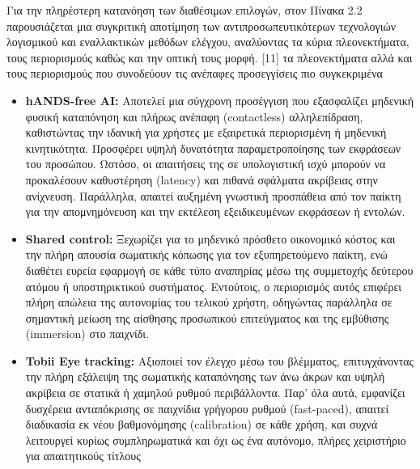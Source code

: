 \documentclass[twoside, a4paper, 11pt]{article}
\begin{document}
Για την πληρέστερη κατανόηση των διαθέσιμων επιλογών, στον Πίνακα 2.2 παρουσιάζεται μια συγκριτική αποτίμηση των αντιπροσωπευτικότερων τεχνολογιών λογισμικού και εναλλακτικών μεθόδων ελέγχου, αναλύοντας τα κύρια πλεονεκτήματα, τους περιορισμούς καθώς και την οπτική τους μορφή. [11]
τα πλεονεκτήματα αλλά και τους περιορισμούς που συνοδεύουν τις ανέπαφες προσεγγίσεις πιο συγκεκριμένα
\begin{itemize}
    \item \textbf{hANDS-free AI:} Αποτελεί μια σύγχρονη προσέγγιση που εξασφαλίζει μηδενική φυσική καταπόνηση και πλήρως ανέπαφη (contactless) αλληλεπίδραση, καθιστώντας την ιδανική για χρήστες με εξαιρετικά περιορισμένη ή μηδενική κινητικότητα. Προσφέρει υψηλή δυνατότητα παραμετροποίησης των εκφράσεων του προσώπου. Ωστόσο, οι απαιτήσεις της σε υπολογιστική ισχύ μπορούν να προκαλέσουν καθυστέρηση (latency) και πιθανά σφάλματα ακρίβειας στην ανίχνευση. Παράλληλα, απαιτεί αυξημένη γνωστική προσπάθεια από τον παίκτη για την απομνημόνευση και την εκτέλεση εξειδικευμένων εκφράσεων ή εντολών.
    \item \textbf{Shared control:} Ξεχωρίζει για το μηδενικό πρόσθετο οικονομικό κόστος και την πλήρη απουσία σωματικής κόπωσης για τον εξυπηρετούμενο παίκτη, ενώ διαθέτει ευρεία εφαρμογή σε κάθε τύπο αναπηρίας μέσω της συμμετοχής δεύτερου ατόμου ή υποστηρικτικού συστήματος. Εντούτοις, ο περιορισμός αυτός επιφέρει πλήρη απώλεια της αυτονομίας του τελικού χρήστη, οδηγώντας παράλληλα σε σημαντική μείωση της αίσθησης προσωπικού επιτεύγματος και της εμβύθισης (immersion) στο παιχνίδι.
    \item \textbf{Tobii Eye tracking:}  Αξιοποιεί τον έλεγχο μέσω του βλέμματος, επιτυγχάνοντας την πλήρη εξάλειψη της σωματικής καταπόνησης των άνω άκρων και υψηλή ακρίβεια σε στατικά ή χαμηλού ρυθμού περιβάλλοντα. Παρ' όλα αυτά, εμφανίζει δυσχέρεια ανταπόκρισης σε παιχνίδια γρήγορου ρυθμού (fast-paced), απαιτεί διαδικασία εκ νέου βαθμονόμησης (calibration) σε κάθε χρήση, και συχνά λειτουργεί κυρίως συμπληρωματικά και όχι ως ένα αυτόνομο, πλήρες χειριστήριο για απαιτητικούς τίτλους
\end{itemize}
\end{document}
